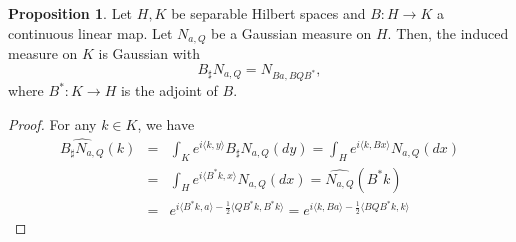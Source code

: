 \documentclass[10pt, a4paper]{report}
\theoremstyle{definition}
\newtheorem{prop}{Proposition}
\theoremstyle{remark}
\begin{document}
\begin{prop}\label{lingausshilb}
	Let $H,K$ be separable Hilbert spaces and $B:H\to K$ a continuous linear map. Let $N_{a,Q}$ be a Gaussian measure on $H$. Then, the induced measure on $K$ is Gaussian with
	$$B_\sharp N_{a,Q} = N_{Ba, BQB^*},$$
	where $B^*:K \to H$ is the adjoint of $B$. 
	\begin{proof}
		For any $k\in K$, we have 
		\begin{eqnarray}
			\widehat{B_\sharp N_{a,Q}}(k) & = & \int_K e^{i\langle k,y\rangle} B_\sharp N_{a,Q}(dy)=\int_H e^{i\langle k,Bx\rangle} N_{a,Q}(dx)\\
			 &= & \int_H e^{i\langle B^*k,x\rangle} N_{a,Q}(dx) = \widehat{N_{a,Q}}(B^*k)\\
			 & = & e^{i\langle B^*k,a\rangle -\frac{1}{2}\langle QB^*k,B^*k\rangle} = e^{i\langle k,Ba\rangle -\frac{1}{2}\langle BQB^*k,k\rangle}
		\end{eqnarray}
	\end{proof} 
\end{prop}
\end{document}
